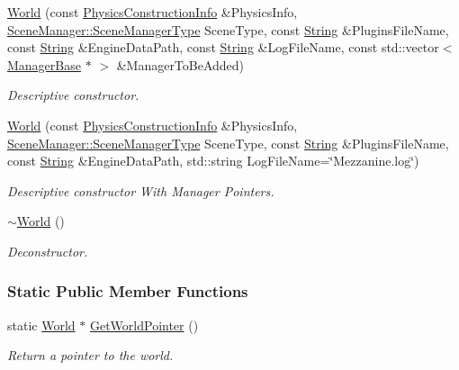 \begin{DoxyCompactItemize}
\hyperlink{classMezzanine_1_1World_ade1cbb85b206dffa93b963850358d08c}{World} (const \hyperlink{classMezzanine_1_1PhysicsConstructionInfo}{PhysicsConstructionInfo} \&PhysicsInfo, \hyperlink{classMezzanine_1_1SceneManager_ad6e20c08b97a230314abda3e5826f274}{SceneManager::SceneManagerType} SceneType, const \hyperlink{namespaceMezzanine_acf9fcc130e6ebf08e3d8491aebcf1c86}{String} \&PluginsFileName, const \hyperlink{namespaceMezzanine_acf9fcc130e6ebf08e3d8491aebcf1c86}{String} \&EngineDataPath, const \hyperlink{namespaceMezzanine_acf9fcc130e6ebf08e3d8491aebcf1c86}{String} \&LogFileName, const std::vector$<$ \hyperlink{classMezzanine_1_1ManagerBase}{ManagerBase} $\ast$ $>$ \&ManagerToBeAdded)
\begin{DoxyCompactList}\small\item\em Descriptive constructor. \item\end{DoxyCompactList}\item 
\hyperlink{classMezzanine_1_1World_a7621d71f549867f04d582afdead60363}{World} (const \hyperlink{classMezzanine_1_1PhysicsConstructionInfo}{PhysicsConstructionInfo} \&PhysicsInfo, \hyperlink{classMezzanine_1_1SceneManager_ad6e20c08b97a230314abda3e5826f274}{SceneManager::SceneManagerType} SceneType, const \hyperlink{namespaceMezzanine_acf9fcc130e6ebf08e3d8491aebcf1c86}{String} \&PluginsFileName, const \hyperlink{namespaceMezzanine_acf9fcc130e6ebf08e3d8491aebcf1c86}{String} \&EngineDataPath, std::string LogFileName=\char`\"{}Mezzanine.log\char`\"{})
\begin{DoxyCompactList}\small\item\em Descriptive constructor With Manager Pointers. \item\end{DoxyCompactList}\item 
\hyperlink{classMezzanine_1_1World_ab533dec5e04892f3db0dbe7c01732b0a}{$\sim$World} ()
\begin{DoxyCompactList}\small\item\em Deconstructor. \item\end{DoxyCompactList}\end{DoxyCompactItemize}
\subsubsection*{Static Public Member Functions}
\begin{DoxyCompactItemize}
\item 
static \hyperlink{classMezzanine_1_1World}{World} $\ast$ \hyperlink{classMezzanine_1_1World_a8d714f7655aa563cd66cee8db59f9116}{GetWorldPointer} ()
\begin{DoxyCompactList}\small\item\em Return a pointer to the world. \item\end{DoxyCompactList}\end{DoxyCompactItemize}
